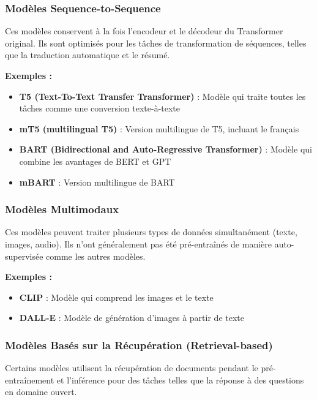 \subsubsection{Modèles Sequence-to-Sequence}

Ces modèles conservent à la fois l'encodeur et le décodeur du Transformer original. Ils sont optimisés pour les tâches de transformation de séquences, telles que la traduction automatique et le résumé.

\textbf{Exemples :}
\begin{itemize}
    \item \textbf{T5 (Text-To-Text Transfer Transformer)} \cite{raffel2019exploring} : Modèle qui traite toutes les tâches comme une conversion texte-à-texte
    \item \textbf{mT5 (multilingual T5)} : Version multilingue de T5, incluant le français
    \item \textbf{BART (Bidirectional and Auto-Regressive Transformer)} \cite{lewis2020bart} : Modèle qui combine les avantages de BERT et GPT
    \item \textbf{mBART} : Version multilingue de BART
\end{itemize}

\subsubsection{Modèles Multimodaux}

Ces modèles peuvent traiter plusieurs types de données simultanément (texte, images, audio). Ils n'ont généralement pas été pré-entraînés de manière auto-supervisée comme les autres modèles.

\textbf{Exemples :}
\begin{itemize}
    \item \textbf{CLIP} : Modèle qui comprend les images et le texte
    \item \textbf{DALL-E} : Modèle de génération d'images à partir de texte
\end{itemize}

\subsubsection{Modèles Basés sur la Récupération (Retrieval-based)}

Certains modèles utilisent la récupération de documents pendant le pré-entraînement et l'inférence pour des tâches telles que la réponse à des questions en domaine ouvert.

